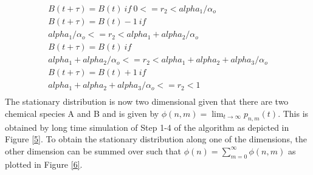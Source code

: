 \documentclass[10 pt]{article}
\begin{document}
\begin{multicols}{2}
\begin{multline*}
B(t+\tau) = B(t)  \: if \:  0 <= r_2< alpha_1/\alpha_o \\
B(t+\tau) = B(t) - 1 \: if \: \\alpha_1/\alpha_o<= r_2< alpha_1+alpha_2/\alpha_o\\
B(t+\tau) = B(t) \: if \: \\alpha_1+alpha_2/\alpha_o<= r_2< alpha_1+alpha_2+alpha_3/\alpha_o\\
B(t+\tau) = B(t) + 1 \: if \: \\ alpha_1+alpha_2+alpha_3/\alpha_o<= r_2< 1 \\
\end{multline*}
The stationary distribution is now two dimensional given that there are two chemical species A and B and is given by $\phi(n,m) = \lim_{t\rightarrow\infty} p_{n,m}(t) $. This is obtained by long time simulation of Step 1-4 of the algorithm as depicted in Figure \ref{5}. To obtain the stationary distribution along one of the dimensions, the other dimension can be summed over such that $\phi(n) = \displaystyle\sum_{m=0}^{\infty} \phi(n,m)$ as plotted in Figure \ref{6}.


\end{multicols}
\end{document}
